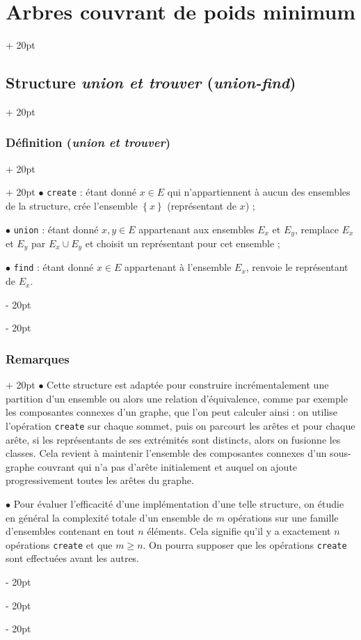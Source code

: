\documentclass[a4paper, 12pt, twoside]{article}
\newcommand{\set}[1]{\left\{ #1 \right\}}
\renewcommand{\ge}{\geqslant}
\newcommand{\ind}[1][20pt]{\advance\leftskip + #1}
\newcommand{\deind}[1][20pt]{\advance\leftskip - #1}
\newenvironment{indt}[2][20pt]{#2 \par \ind[#1]}{\par \deind} %
\begin{document}
\begin{indt}{\section{Arbres couvrant de poids minimum}}
\begin{indt}{\subsection{Structure \textit{union et trouver} (\textit{union-find})}}
\begin{indt}{\subsubsection{Définition (\textit{union et trouver})}}
                \begin{indt}{}
                    $\bullet$ \texttt{create} : étant donné $x \in E$ qui n'appartiennent à aucun des ensembles de la structure, crée l'ensemble $\set x$ (représentant de $x$) ;

                    \vspace{6pt}
                    
                    $\bullet$  \texttt{union} : étant donné $x, y \in E$ appartenant aux ensembles $E_x$ et $E_y$, remplace $E_x$ et $E_y$ par $E_x \cup E_y$ et choisit un représentant pour cet ensemble ;

                    \vspace{6pt}
                    
                    $\bullet$ \texttt{find} : étant donné $x \in E$ appartenant à l'ensemble $E_x$, renvoie le représentant de $E_x$.
                \end{indt}
            \end{indt}

            \vspace{12pt}
            
            \begin{indt}{\subsubsection{Remarques}}
                $\bullet$ Cette structure est adaptée pour construire incrémentalement une partition d'un ensemble ou alors une relation d'équivalence, comme par exemple les composantes connexes d'un graphe, que l'on peut calculer ainsi : on utilise l'opération \texttt{create} sur chaque sommet, puis on parcourt les arêtes et pour chaque arête, si les représentants de ses extrémités sont distincts, alors on fusionne les classes. Cela revient à maintenir l'ensemble des composantes connexes d'un sous-graphe couvrant qui n'a pas d'arête initialement et auquel on ajoute progressivement toutes les arêtes du graphe.

                \vspace{6pt}
                
                $\bullet$ Pour évaluer l'efficacité d'une implémentation d'une telle structure, on étudie en général la complexité totale d'un ensemble de $m$ opérations sur une famille d'ensembles contenant en tout $n$ éléments.
                Cela signifie qu'il y a exactement $n$ opérations \texttt{create} et que $m \ge n$.
                On pourra supposer que les opérations \texttt{create} sont effectuées avant les autres.
            \end{indt}


\end{indt}
\end{indt}
\end{document}
